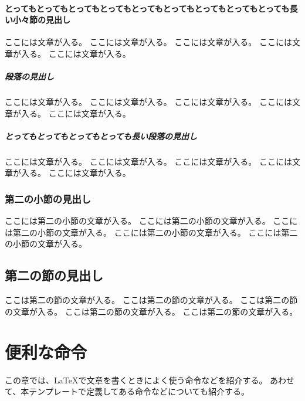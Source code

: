 \documentclass[ %
	uplatex,%
	a5paper,%
	papersize%
	]{jsbook}
\begin{document}
						\subsubsection{とってもとってもとってもとってもとってもとってもとってもとってもとっても長い小々節の見出し}

						ここには文章が入る。
						ここには文章が入る。
						ここには文章が入る。
						ここには文章が入る。
						ここには文章が入る。

						\paragraph{段落の見出し}

						ここには文章が入る。
						ここには文章が入る。
						ここには文章が入る。
						ここには文章が入る。
						ここには文章が入る。

						\paragraph{とってもとってもとってもとっても長い段落の見出し}

						ここには文章が入る。
						ここには文章が入る。
						ここには文章が入る。
						ここには文章が入る。
						ここには文章が入る。

						\subsection{第二の小節の見出し}

						ここには第二の小節の文章が入る。
						ここには第二の小節の文章が入る。
						ここには第二の小節の文章が入る。
						ここには第二の小節の文章が入る。
						ここには第二の小節の文章が入る。

						\section{第二の節の見出し}

						ここは第二の節の文章が入る。
						ここは第二の節の文章が入る。
						ここは第二の節の文章が入る。
						ここは第二の節の文章が入る。
						ここは第二の節の文章が入る。

						\chapter{便利な命令}

						\begin{summary}
							この章では、\LaTeX で文章を書くときによく使う命令などを紹介する。
							あわせて、本テンプレートで定義してある命令などについても紹介する。
						\end{summary}
\end{document}
